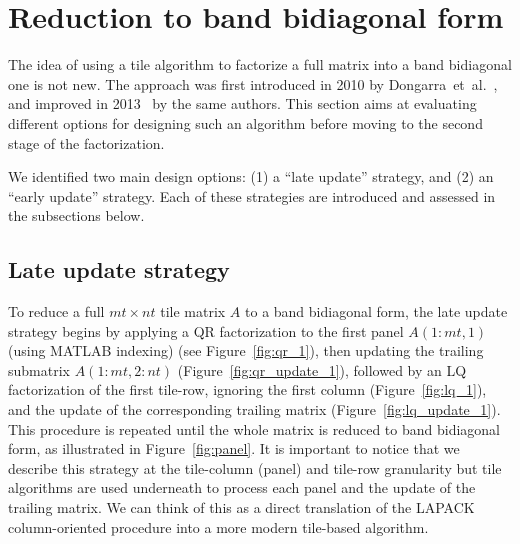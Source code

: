 \section{Reduction  to band bidiagonal form}
\label{sec:band}
The idea of using a tile algorithm to factorize a full matrix into
a band bidiagonal one is not new.
The approach was first introduced in 2010 by
Dongarra~et~al\@.~\cite{ltaief2010parallel},
and improved in 2013~\cite{haidar2013improved}
by the same authors.
This section aims at evaluating different options for
designing such an algorithm
before moving to the second stage of the factorization.

We identified two main design options:
(1) a ``late update'' strategy, and
(2) an ``early update'' strategy.
Each of these strategies are introduced
and assessed in the subsections below.

\subsection{Late update strategy}
To reduce a full $mt \times nt$ tile matrix $A$ to a band bidiagonal
form, the late update strategy begins by applying a QR
factorization to the first panel $A(1:mt,1)$ (using MATLAB indexing)
(see Figure~\ref{fig:qr_1}), then updating the trailing
submatrix $A(1:mt,2:nt)$ (Figure~\ref{fig:qr_update_1}), followed
by an LQ factorization of the first tile-row,
ignoring the first column (Figure~\ref{fig:lq_1}),
and the update of the corresponding trailing matrix
(Figure~\ref{fig:lq_update_1}).
This procedure is repeated until the whole matrix is reduced to
band bidiagonal form, as illustrated in Figure~\ref{fig:panel}.
It is important to notice that we describe this strategy
at the tile-column (panel) and tile-row granularity but
tile algorithms are used underneath to process each panel
and the update of the trailing matrix.
We can think of this as a direct translation of the LAPACK
column-oriented procedure into a
more modern tile-based algorithm.

